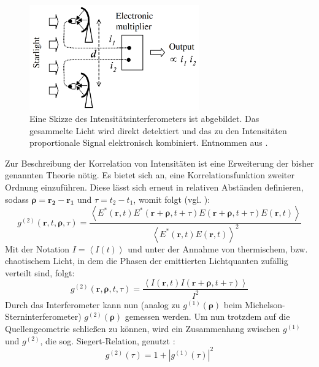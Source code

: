 \begin{figure}[h]
    \centering
    \includegraphics[width=0.65\textwidth]{images/Theorie/Fox_6.1b.png}
    \caption{Eine Skizze des Intensitätsinterferometers ist abgebildet. Das gesammelte Licht wird direkt detektiert und das zu den Intensitäten proportionale Signal elektronisch kombiniert. Entnommen aus \cite[Fig. 6.1(b)]{foxQuantumOpticsIntroduction2006}.}
    \label{fig:Intensitätsinterferometer}
\end{figure}
Zur Beschreibung der Korrelation von Intensitäten ist eine Erweiterung der bisher genannten Theorie nötig. 
Es bietet sich an, eine Korrelationsfunktion zweiter Ordnung einzuführen. 
Diese lässt sich erneut in relativen Abständen definieren, sodass $\bm{\rho} = \mathbf{r_2} - \mathbf{r_1}$ und $\tau = t_2 - t_1$, womit folgt (vgl. \cite{foellmiIntensityInterferometrySecondorder2009}):
\begin{equation}
    g^{(2)}(\mathbf{r}, t, \bm{\rho}, \tau) = \frac{\left<E^*(\mathbf{r}, t)E^*(\mathbf{r}+\bm{\rho}, t+\tau)E(\mathbf{r}+\bm{\rho}, t+\tau)E(\mathbf{r}, t)\right>}
        {\left<E^*(\mathbf{r}, t)E(\mathbf{r}, t)\right>^2}
\end{equation}
Mit der Notation $I=\left<I(t)\right>$ und unter der Annahme von thermischem, bzw. chaotischem Licht, in dem die Phasen der emittierten Lichtquanten zufällig verteilt sind, folgt:
\begin{equation}
    g^{(2)}(\mathbf{r}, \bm{\rho}, t, \tau) =  \frac{\left<I(\mathbf{r}, t) I(\mathbf{r}+\bm{\rho}, t+\tau)\right>}{I^2}
    \label{eq:g2_final}
\end{equation}
Durch das Interferometer kann nun (analog zu $g^{(1)}(\bm{\rho})$ beim Michelson-Sterninterferometer) $g^{(2)}(\bm{\rho})$ gemessen werden. 
Um nun trotzdem auf die Quellengeometrie schließen zu können, wird ein Zusammenhang zwischen $g^{(1)}$ und $g^{(2)}$, die sog. Siegert-Relation, genutzt \cite{lasseguesFieldIntensityCorrelations2022}:
\begin{equation}
    g^{(2)}(\tau) = 1+ \left|g^{(1)}(\tau)\right|^2
\end{equation}
